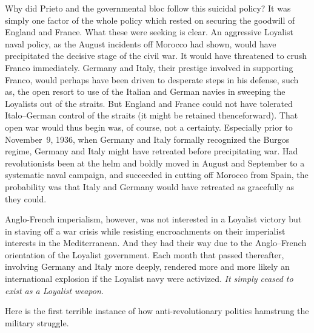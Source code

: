 Why did Prieto and the governmental bloc follow this suicidal policy? It was simply one factor of the whole policy which rested on securing the goodwill of England and France. What these were seeking is clear. An aggressive Loyalist naval policy, as the August incidents off Morocco had shown, would have precipitated the decisive stage of the civil war. It would have threatened to crush Franco immediately. Germany and Italy, their prestige involved in supporting Franco, would perhaps have been driven to desperate steps in his defense, such as, the open resort to use of the Italian and German navies in sweeping the Loyalists out of the straits. But England and France could not have tolerated Italo--German control of the straits (it might be retained thenceforward). That open war would thus begin was, of course, not a certainty. Especially prior to November~9, 1936, when Germany and Italy formally recognized the Burgos regime, Germany and Italy might have retreated before precipitating war. Had revolutionists been at the helm and boldly moved in August and September to a systematic naval campaign, and succeeded in cutting off Morocco from Spain, the probability was that Italy and Germany would have retreated as gracefully as they could.

Anglo-French imperialism, however, was not interested in a Loyalist victory but in staving off a war crisis while resisting encroachments on their imperialist interests in the Mediterranean. And they had their way due to the Anglo--French orientation of the Loyalist government. Each month that passed thereafter, involving Germany and Italy more deeply, rendered more and more likely an international explosion if the Loyalist navy were activized. \emph{It simply ceased to exist as a Loyalist weapon.}

Here is the first terrible instance of how anti-revolutionary politics hamstrung the military struggle.

